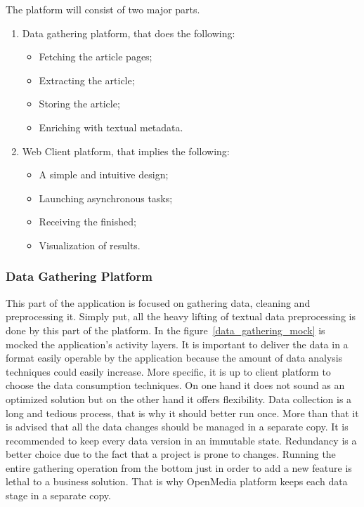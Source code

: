 The platform will consist of two major parts.
\begin{enumerate}
    \item Data gathering platform, that does the following:
    \begin{itemize}
        \item Fetching the article pages;
        \item Extracting the article;
        \item Storing the article;
        \item Enriching with textual metadata.
    \end{itemize}
    \item Web Client platform, that implies the following:
    \begin{itemize}
        \item A simple and intuitive design;
        \item Launching asynchronous tasks;
        \item Receiving the finished;
        \item Visualization of results.
    \end{itemize}
\end{enumerate}

\subsubsection{Data Gathering Platform}
This part of the application is focused on gathering data, cleaning and preprocessing it. Simply put, all the heavy lifting of textual data preprocessing is done by this part of the platform. In the \mbox{figure \ref{data_gathering_mock}} is mocked the application's activity layers. It is important to deliver the data in a format easily operable by the application because the amount of data analysis techniques could easily increase. More specific, it is up to client platform to choose the data consumption techniques. On one hand it does not sound as an optimized solution but on the other hand it offers flexibility. Data collection is a long and tedious process, that is why it should better run once. More than that it is advised that all the data changes should be managed in a separate copy. It is recommended to keep every data version in an immutable state. Redundancy is a better choice due to the fact that a project is prone to changes. Running the entire gathering operation from the bottom just in order to add a new feature is lethal to a business solution. That is why OpenMedia platform keeps each data stage in a separate copy.

